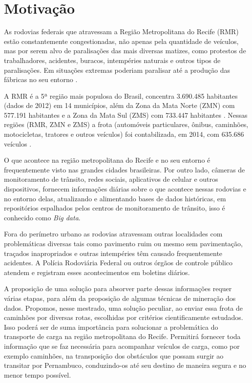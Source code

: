 
\section{ Motivação}\label{intro:motivacao}

As rodovias federais que atravessam a Região Metropolitana do Recife (RMR) estão constantemente congestionadas, não apenas pela 
quantidade de veículos, mas por serem alvo de paralisações das mais diversas matizes, como protestos de trabalhadores, acidentes, 
buracos, intempéries naturais e outros tipos de paralisações. 
Em situações extremas poderiam paralisar até a produção das fábricas no seu entorno \cite{BNDES2013}. 

A RMR é a 5ª região mais populosa do Brasil, concentra 3.690.485 habitantes (dados de 2012) em 14 municípios, além da 
Zona da Mata Norte (ZMN) com 577.191 habitantes e a Zona da Mata Sul (ZMS) com 733.447 habitantes \cite{Bitoun2012}. 
Nessas regiões (RMR, ZMN e ZMS) a frota (automóveis particulares, ônibus, caminhões, motocicletas, tratores e outros veículos) 
foi contabilizada, em 2014, com 635.686 veículos \cite{FrotaVeiculosIBGE}.

O que acontece na região metropolitana do Recife e no seu entorno é frequentemente visto nas grandes cidades brasileiras.
Por outro lado, câmeras de monitoramento de trânsito, redes sociais, aplicativos de celular e outros dispositivos, fornecem informações diárias sobre o que acontece nessas 
rodovias e no entorno delas, atualizando e alimentando bases de dados históricas, em repositórios espalhados pelos centros de 
monitoramento de trânsito, isso é conhecido como \textit{Big data}.

Fora do perímetro urbano as rodovias atravessam outras localidades com problemáticas diversas tais como pavimento ruim ou mesmo sem pavimentação, 
traçados inapropriados e outras intempéries têm causado frequentemente acidentes.
A Polícia Rodoviária Federal ou outros órgãos de controle público atendem e registram esses acontecimentos em boletins diários.

A proposição de uma solução para absorver parte dessas informações requer várias etapas, para além da proposição de algumas técnicas de mineração dos dados.
Propomos, nesse mestrado, uma solução peculiar, ao enviar essa frota de caminhões por diversas rotas, escolhidas por critérios cientificamente estudados.
Isso poderá ser de suma importância para solucionar a problemática do transporte de carga na região metropolitana 
do Recife. Permitirá fornecer toda informação que se faz necessária para acompanhar veículos de carga, como por exemplo caminhões, 
na transposição dos obstáculos que possam surgir ao transitar por Pernambuco, conduzindo-os até seu destino de maneira segura e no menor tempo possível.


